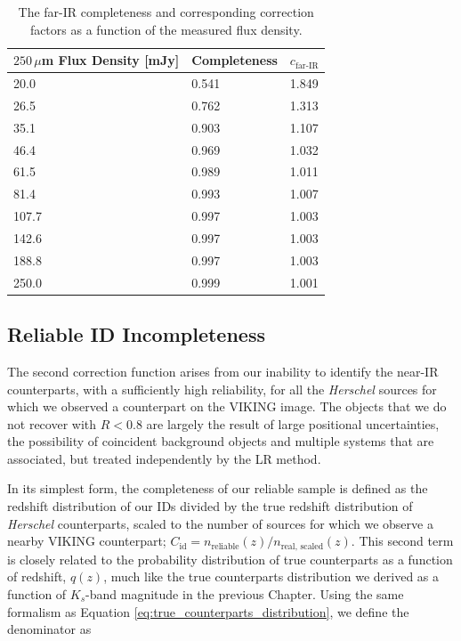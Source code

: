 \begin{table}
    \centering
    \begin{tabular}{p{5cm}|p{2.5cm}|p{2.5cm}}
        \hline
        \hline
        $250\,\mu$m Flux Density [mJy] & Completeness & $c_{\textrm{far-IR}}$ \\
        \hline
        \hline
        20.0 & 0.541 & 1.849 \\
        26.5 & 0.762 & 1.313 \\
        35.1 & 0.903 & 1.107 \\
        46.4 & 0.969 & 1.032 \\
        61.5 & 0.989 & 1.011 \\
        81.4 & 0.993 & 1.007 \\
        107.7 & 0.997 & 1.003 \\
        142.6 & 0.997 & 1.003 \\
        188.8 & 0.997 & 1.003 \\
        250.0 & 0.999 & 1.001 \\
        \hline
    \end{tabular}
    \caption[Far-IR catalogue completeness as a function of $250\,\mu$m flux density]{The far-IR completeness and corresponding correction factors as a function of the measured flux density.}
    \label{tab:submm_completeness_table}
\end{table}

\subsection{Reliable ID Incompleteness}

The second correction function arises from our inability to identify the near-IR counterparts, with a sufficiently high reliability, for all the \textit{Herschel} sources for which we observed a counterpart on the VIKING image. The objects that we do not recover with $R < 0.8$ are largely the result of large positional uncertainties, the possibility of coincident background objects and multiple systems that are associated, but treated independently by the LR method. 

In its simplest form, the completeness of our reliable sample is defined as the redshift distribution of our IDs divided by the true redshift distribution of \textit{Herschel} counterparts, scaled to the number of sources for which we observe a nearby VIKING counterpart; $C_{\textrm{id}} = n_{\textrm{reliable}}(z)/n_{\textrm{real, scaled}}(z)$. This second term is closely related to the probability distribution of true counterparts as a function of redshift, $q(z)$, much like the true counterparts distribution we derived as a function of $K_s$-band magnitude in the previous Chapter. Using the same formalism as Equation \ref{eq:true_counterparts_distribution}, we define the denominator as


